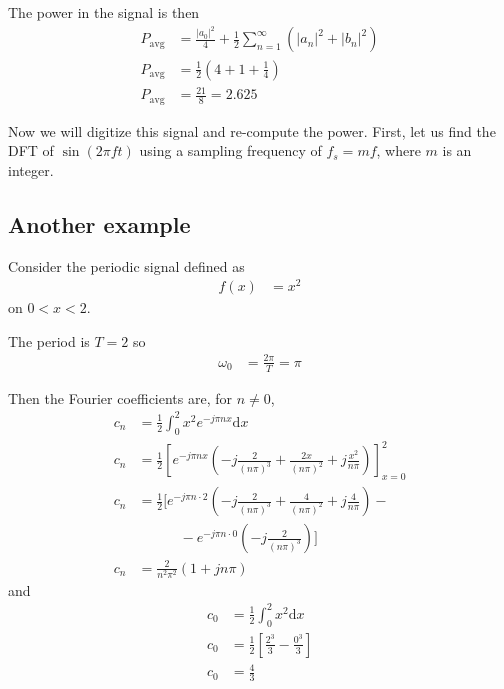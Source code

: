 \documentclass[twocolumn]{myarticle}
\renewcommand{\d}{\mathrm{d}}
\begin{document}
The power in the signal is then
\begin{align}
    P_\text{avg} &= \frac{|a_0|^2}{4} + \frac{1}{2} \sum_{n=1}^{\infty} \left( |a_n|^2 + |b_n|^2 \right)
    \\
    P_\text{avg} &= \frac{1}{2} \left( 4 + 1 + \frac{1}{4} \right)
    \\
    P_\text{avg} &= \frac{21}{8} = 2.625
\end{align}

Now we will digitize this signal and re-compute the power.
First, let us find the DFT of $ \sin(2 \pi f t) $ using a sampling frequency of $ f_s = m f $, where $ m $ is an integer.

\subsection{Another example}
\label{subsec:another_example}

Consider the periodic signal defined as
\begin{align}
    f(x) &= x^2
\end{align}
on $ 0 < x < 2 $.

The period is $ T = 2 $ so
\begin{align}
    \omega_0 &= \frac{2 \pi}{T} = \pi
\end{align}

Then the Fourier coefficients are, for $ n \neq 0 $,
\begin{align}
    c_n &= \frac{1}{2} \int_{0}^{2} x^2 e^{-j \pi n x} \d x
    \\
    c_n &= \frac{1}{2} \left[ e^{-j \pi n x} \left( - j \frac{2}{(n\pi)^3} + \frac{2 x}{(n\pi)^2} + j \frac{x^2}{n \pi}\right)  \right]_{x=0}^2
    \\
    c_n &= \frac{1}{2} \Bigg[ e^{-j \pi n \cdot 2} \left( - j \frac{2}{(n\pi)^3} + \frac{4}{(n\pi)^2} + j \frac{4}{n \pi}\right) - \nonumber
    \\
    & \qquad \quad - e^{- j \pi n \cdot 0} \left( -j\frac{2}{(n\pi)^3} \right) \Bigg]
    \\
    c_n &= \frac{2}{n^2 \pi^2} \left( 1 + j n \pi \right)
\end{align}
and
\begin{align}
    c_0 &= \frac{1}{2} \int_{0}^{2} x^2 \d x
    \\
    c_0 &= \frac{1}{2} \left[ \frac{2^3}{3} - \frac{0^3}{3} \right]
    \\
    c_0 &= \frac{4}{3}
\end{align}
\end{document}
